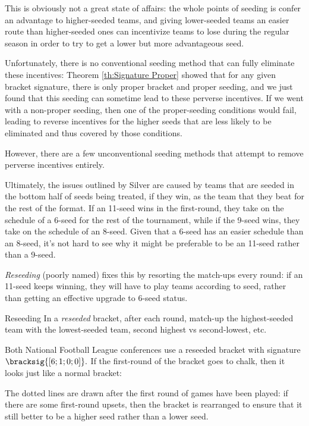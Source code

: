 {This is obviously not a great state of affairs: the whole points of seeding is confer an advantage to higher-seeded teams, and giving lower-seeded teams an easier route than higher-seeded ones can incentivize teams to lose during the regular season in order to try to get a lower but more advantageous seed.

Unfortunately, there is no conventional seeding method that can fully eliminate these incentives: Theorem \ref{th:Signature Proper} showed that for any given bracket signature, there is only proper bracket and proper seeding, and we just found that this seeding can sometime lead to these perverse incentives. If we went with a non-proper seeding, then one of the proper-seeding conditions would fail, leading to reverse incentives for the higher seeds that are less likely to be eliminated and thus covered by those conditions.

However, there are a few unconventional seeding methods that attempt to remove perverse incentives entirely.

Ultimately, the issues outlined by Silver are caused by teams that are seeded in the bottom half of seeds being treated, if they win, as the team that they beat for the rest of the format. If an 11-seed wins in the first-round, they take on the schedule of a 6-seed for the rest of the tournament, while if the 9-seed wins, they take on the schedule of an 8-seed. Given that a 6-seed has an easier schedule than an 8-seed, it's not hard to see why it might be preferable to be an 11-seed rather than a 9-seed.

\textit{Reseeding} (poorly named) fixes this by resorting the match-ups every round: if an 11-seed keeps winning, they will have to play teams according to seed, rather than getting an effective upgrade to 6-seed status.

\begin{definition}{Reseeding}{}
    In a \textit{reseeded} bracket, after each round, match-up the highest-seeded team with the lowest-seeded team, second highest vs second-lowest, etc.
\end{definition}

Both National Football League conferences use a reseeded bracket with signature $\bracksig{[6; 1; 0; 0]}.$ If the first-round of the bracket goes to chalk, then it looks just like a normal bracket:


The dotted lines are drawn after the first round of games have been played: if there are some first-round upsets, then the bracket is rearranged to ensure that it still better to be a higher seed rather than a lower seed.

}
